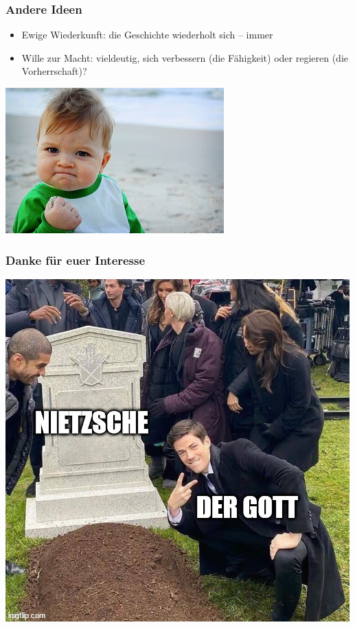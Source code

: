 \documentclass{beamer}
\begin{document}
\begin{frame}
\frametitle{Andere Ideen}
\begin{minipage}{.49\textwidth}
\begin{itemize}
\item Ewige Wiederkunft: die Geschichte wiederholt sich -- immer
\item Wille zur Macht: vieldeutig, sich verbessern (die Fähigkeit) oder regieren (die Vorherrschaft)?
\end{itemize}
\end{minipage}
\begin{minipage}{.49\textwidth}
\includegraphics[width=\textwidth]{macht.jpg}
\end{minipage}
\end{frame}

\begin{frame}
\frametitle{Danke für euer Interesse}
\begin{center}
\includegraphics[height=0.8\textheight]{nietzscheisttot.jpg}
\end{center}
\end{frame}
\end{document}
